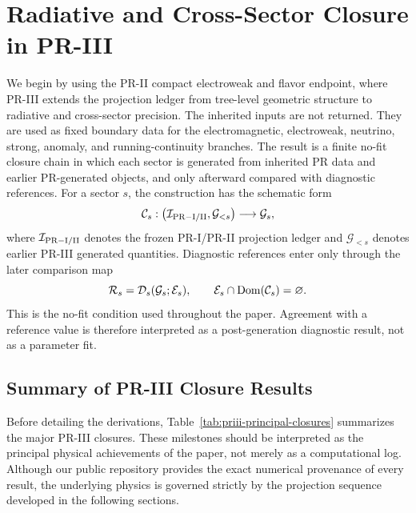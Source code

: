\documentclass[11pt]{article}
\begin{document}
\section{Radiative and Cross-Sector Closure in PR-III}
\label{sec:priii-sandbox-roadmap}

We begin by using the  PR-II compact electroweak and flavor endpoint, where PR-III extends the projection ledger from tree-level geometric structure to radiative and cross-sector precision.  The inherited inputs are not returned.  They are used as fixed boundary data for the electromagnetic, electroweak, neutrino, strong, anomaly, and running-continuity branches.  The result is a finite no-fit closure chain in which each sector is generated from inherited PR data and earlier PR-generated objects, and only afterward compared with diagnostic references. For a sector \(s\), the construction has the schematic form
\begin{equation}
\mathcal C_s:
\bigl(\mathcal I_{\rm PR-I/II},\mathcal G_{<s}\bigr)
\longrightarrow
\mathcal G_s,
\end{equation}
where \(\mathcal I_{\rm PR-I/II}\) denotes the frozen PR-I/PR-II projection ledger and \(\mathcal G_{<s}\) denotes earlier PR-III generated quantities.  Diagnostic references enter only through the later comparison map
\begin{equation}
\mathcal R_s=\mathcal D_s(\mathcal G_s;\mathcal E_s),
\qquad
\mathcal E_s\cap {\rm Dom}(\mathcal C_s)=\varnothing .
\end{equation}
This is the no-fit condition used throughout the paper.  Agreement with a reference value is therefore interpreted as a post-generation diagnostic result, not as a parameter fit.

\subsection{Summary of PR-III Closure Results}
\label{subsec:priii-summary-closure-results}

Before detailing the derivations, Table~\ref{tab:priii-principal-closures} summarizes the major PR-III closures. These milestones should be interpreted as the principal physical achievements of the paper, not merely as a computational log. Although our public repository provides the exact numerical provenance of every result, the underlying physics is governed strictly by the projection sequence developed in the following sections.
\end{document}

